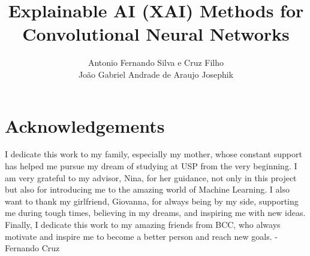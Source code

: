 \documentclass[a4paper,12pt,twoside,brazilian,english]{book}
\title{Explainable AI (XAI) Methods for Convolutional Neural Networks}
\author[mas]{Antonio Fernando Silva e Cruz Filho \\ João Gabriel Andrade de Araujo Josephik}
\begin{document}

\frontmatter

\pagestyle{plain}

\onehalfspacing %

\maketitle %



\chapter*{Acknowledgements}


I dedicate this work to my family, especially my mother, whose constant support has helped me pursue my dream of studying at USP from the very beginning. 
I am very grateful to my advisor, Nina, for her guidance, not only in this project but also for introducing me to the amazing world of Machine Learning. 
I also want to thank my girlfriend, Giovanna, for always being by my side, supporting me during tough times, believing in my dreams, and inspiring me with new ideas. 
Finally, I dedicate this work to my amazing friends from BCC, who always motivate and inspire me to become a better person and reach new goals. - Fernando Cruz





\end{document}
